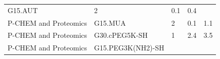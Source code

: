 \documentclass[utf8]{frontiersHLTH} %
\begin{document}
\begin{longtable}[]{@{}lllll@{}}
\begin{minipage}[t]{0.21\columnwidth}
G15.AUT\strut
\end{minipage} & \begin{minipage}[t]{0.06\columnwidth}\raggedright\strut
2\strut
\end{minipage} & \begin{minipage}[t]{0.15\columnwidth}\raggedright\strut
0.1\strut
\end{minipage} & \begin{minipage}[t]{0.08\columnwidth}\raggedright\strut
0.4\strut
\end{minipage}\tabularnewline
\begin{minipage}[t]{0.26\columnwidth}\raggedright\strut
P-CHEM and Proteomics\strut
\end{minipage} & \begin{minipage}[t]{0.21\columnwidth}\raggedright\strut
G15.MUA\strut
\end{minipage} & \begin{minipage}[t]{0.06\columnwidth}\raggedright\strut
2\strut
\end{minipage} & \begin{minipage}[t]{0.15\columnwidth}\raggedright\strut
0.1\strut
\end{minipage} & \begin{minipage}[t]{0.08\columnwidth}\raggedright\strut
1.1\strut
\end{minipage}\tabularnewline
\begin{minipage}[t]{0.26\columnwidth}\raggedright\strut
P-CHEM and Proteomics\strut
\end{minipage} & \begin{minipage}[t]{0.21\columnwidth}\raggedright\strut
G30.cPEG5K-SH\strut
\end{minipage} & \begin{minipage}[t]{0.06\columnwidth}\raggedright\strut
1\strut
\end{minipage} & \begin{minipage}[t]{0.15\columnwidth}\raggedright\strut
2.4\strut
\end{minipage} & \begin{minipage}[t]{0.08\columnwidth}\raggedright\strut
3.5\strut
\end{minipage}\tabularnewline
\begin{minipage}[t]{0.26\columnwidth}\raggedright\strut
P-CHEM and Proteomics\strut
\end{minipage} & \begin{minipage}[t]{0.21\columnwidth}\raggedright\strut
G15.PEG3K(NH2)-SH\strut
\end{minipage} & \begin{minipage}[t]{0.06\columnwidth}\raggedright\strut

\end{minipage}
\end{longtable}
\end{document}
